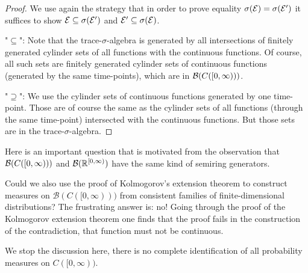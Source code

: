 \begin{proof}[Proof]
	We use again the strategy that in order to prove equality $\sigma(\mathcal{E})=\sigma(\mathcal{E}')$ it suffices to show $\mathcal{E}\subseteq \sigma(\mathcal{E}')$ and $\mathcal{E}'\subseteq \sigma(\mathcal{E})$.\smallskip

	"{}$\subseteq$"{}: Note that the trace-$\sigma$-algebra is generated by all intersections of finitely generated cylinder sets of all functions with the continuous functions. Of course, all such sets are finitely generated cylinder sets of continuous functions (generated by the same time-points), which are in $\mathcal{B} ( C([0,\infty)))$.\smallskip

	"{}$\supseteq$"{}: We use the cylinder sets of continuous functions generated by one time-point. Those are of course the same as the cylinder sets of all functions (through the same time-point) intersected with the continuous functions. But those sets are in the trace-$\sigma$-algebra.
\end{proof}
Here is an important question that is motivated from the observation that $\mathcal{B} ( C([0,\infty)))$ and $\mathcal B(\mathbb{R}^{[0,\infty)})$ have the same kind of semiring generators.
\begin{laufmerksamkeit}
Could we also use the proof of Kolmogorov's extension theorem to construct measures on $\mathcal B(C([0,\infty)))$ from consistent families of finite-dimensional distributions? The frustrating answer is: no! Going through the proof of the Kolmogorov extension theorem one finds that the proof fails in the construction of the contradiction, that function must not be continuous.
\end{laufmerksamkeit}
We stop the discussion here, there is no complete identification of all probability measures on $C([0,\infty))$.\smallskip

